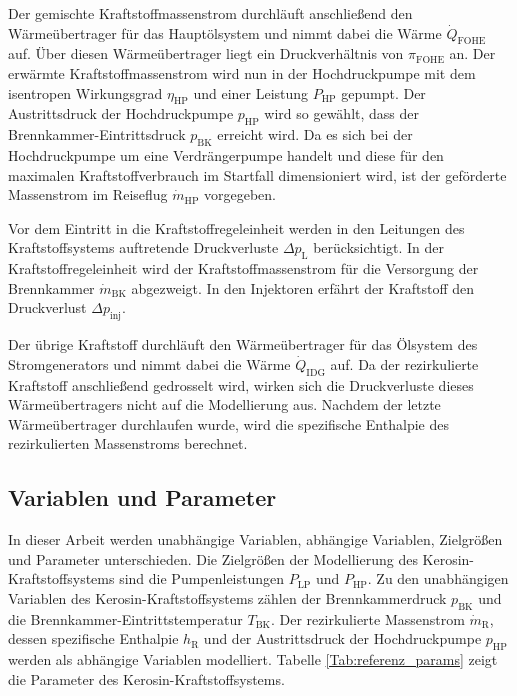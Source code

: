 Der gemischte Kraftstoffmassenstrom durchläuft anschließend den Wärmeübertrager für das Hauptölsystem und nimmt dabei die Wärme $\dot{Q}_{\mathrm{FOHE}}$ auf. Über diesen Wärmeübertrager liegt ein Druckverhältnis von $\pi_{\mathrm{FOHE}}$ an. Der erwärmte Kraftstoffmassenstrom wird nun in der Hochdruckpumpe mit dem isentropen Wirkungsgrad $\eta_{\mathrm{HP}}$ und einer Leistung $P_{\mathrm{HP}}$ gepumpt. Der Austrittsdruck der Hochdruckpumpe $p_{\mathrm{HP}}$ wird so gewählt, dass der Brennkammer-Eintrittsdruck $p_{\mathrm{BK}}$ erreicht wird.  Da es sich bei der Hochdruckpumpe um eine Verdrängerpumpe handelt und diese für den maximalen Kraftstoffverbrauch im Startfall dimensioniert wird, ist der geförderte Massenstrom im Reiseflug $\dot{m}_{\mathrm{HP}}$ vorgegeben. 

Vor dem Eintritt in die Kraftstoffregeleinheit werden in den Leitungen des Kraftstoffsystems auftretende Druckverluste $\Delta p_{\mathrm{L}}$  berücksichtigt. In der Kraftstoffregeleinheit wird der Kraftstoffmassenstrom für die Versorgung der Brennkammer $\dot{m}_{\mathrm{BK}}$ abgezweigt. In den Injektoren erfährt der Kraftstoff den Druckverlust $\Delta p_{\mathrm{inj}}$. 

Der übrige Kraftstoff durchläuft den Wärmeübertrager für das Ölsystem des Stromgenerators und nimmt dabei die Wärme $\dot{Q}_{\mathrm{IDG}}$ auf. Da der rezirkulierte Kraftstoff anschließend gedrosselt wird, wirken sich die Druckverluste dieses Wärmeübertragers nicht auf die Modellierung aus. Nachdem der letzte Wärmeübertrager durchlaufen wurde, wird die spezifische Enthalpie des rezirkulierten Massenstroms berechnet.

\subsection{Variablen und Parameter}

In dieser Arbeit werden unabhängige Variablen, abhängige Variablen, Zielgrößen und Parameter unterschieden. Die Zielgrößen der Modellierung des Kerosin-Kraftstoffsystems sind die Pumpenleistungen $P_{\mathrm{LP}}$ und $P_{\mathrm{HP}}$. Zu den unabhängigen Variablen des Kerosin-Kraftstoffsystems zählen der Brennkammerdruck $p_{\mathrm{BK}}$ und die Brennkammer-Eintrittstemperatur $T_{\mathrm{BK}}$. Der rezirkulierte Massenstrom $\dot{m}_\mathrm{R}$, dessen spezifische Enthalpie $h_\mathrm{R}$ und der Austrittsdruck der Hochdruckpumpe $p_{\mathrm{HP}}$ werden als abhängige Variablen modelliert. Tabelle \ref{Tab:referenz_params} zeigt die Parameter des Kerosin-Kraftstoffsystems.

